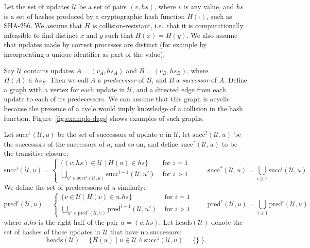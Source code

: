 \documentclass[a4paper,anonymous,USenglish]{lipics-v2019}
\begin{document}
Let the set of updates $\mathcal{U}$ be a set of pairs $(v, \mathit{hs})$, where $v$ is any value, and $\mathit{hs}$ is a set of hashes produced by a cryptographic hash function $H(\cdot)$, such as SHA-256.
We assume that $H$ is collision-resistant, i.e.\ that it is computationally infeasible to find distinct $x$ and $y$ such that $H(x) = H(y)$.
We also assume that updates made by correct processes are distinct (for example by incorporating a unique identifier as part of the value).

Say $\mathcal{U}$ contains updates $A = (v_A, \mathit{hs}_A)$ and $B = (v_B, \mathit{hs}_B)$, where $H(A) \in \mathit{hs}_B$.
Then we call $A$ a \emph{predecessor} of $B$, and $B$ a \emph{successor} of $A$.
Define a graph with a vertex for each update in $\mathcal{U}$, and a directed edge from each update to each of its predecessors.
We can assume that this graph is acyclic because the presence of a cycle would imply knowledge of a collision in the hash function.
Figure~\ref{fig:example-dags} shows examples of such graphs.

Let $\mathrm{succ}^1(\mathcal{U}, u)$ be the set of successors of update $u$ in $\mathcal{U}$, let $\mathrm{succ}^2(\mathcal{U}, u)$ be the successors of the successors of $u$, and so on, and define $\mathrm{succ}^*(\mathcal{U}, u)$ to be the transitive closure:
\[
\mathrm{succ}^i(\mathcal{U}, u) =
\begin{cases}
\{( v, \mathit{hs}) \in \mathcal{U} \mid H(u) \in \mathit{hs}\} & \text{ for } i=1 \\
\bigcup_{u' \in \mathrm{succ}^1(\mathcal{U}, u)} \mathrm{succ}^{i-1}(\mathcal{U}, u') & \text{ for } i>1
\end{cases}
\hspace{30pt}
\mathrm{succ}^*(\mathcal{U}, u) = \bigcup_{i \ge 1} \mathrm{succ}^i(\mathcal{U}, u)
\]
We define the set of predecessors of $u$ similarly:
\[
\mathrm{pred}^i(\mathcal{U}, u) =
\begin{cases}
\{ v \in \mathcal{U} \mid H(v) \in u.\mathit{hs}\} & \text{ for } i=1 \\
\bigcup_{u' \in \mathrm{pred}^1(\mathcal{U}, u)} \mathrm{pred}^{i-1}(\mathcal{U}, u') & \text{ for } i>1
\end{cases}
\hspace{26pt}
\mathrm{pred}^*(\mathcal{U}, u) = \bigcup_{i \ge 1} \mathrm{pred}^i(\mathcal{U}, u)
\]
where $u.\mathit{hs}$ is the right half of the pair $u = (v, \mathit{hs})$.
Let $\mathrm{heads}(\mathcal{U})$ denote the set of hashes of those updates in $\mathcal{U}$ that have no successors:
\[ \mathrm{heads}(\mathcal{U}) = \{H(u) \mid u \in \mathcal{U} \wedge \mathrm{succ}^1(\mathcal{U}, u) = \{\}\;\}. \]
\end{document}
